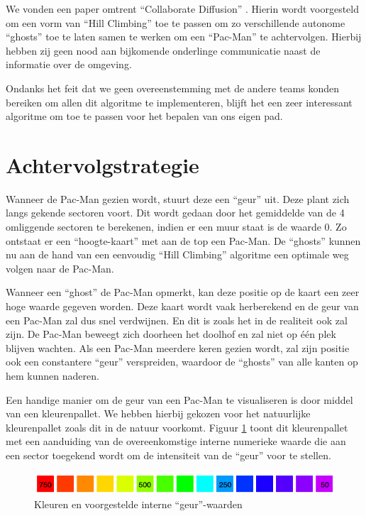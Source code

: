 \documentclass[12pt,a4paper]{report}
\begin{document}
We vonden een paper omtrent ``Collaborate Diffusion'' \cite{Repenning06}. Hierin wordt voorgesteld om een vorm van ``Hill Climbing'' toe te passen om zo verschillende autonome ``ghosts'' toe te laten samen te werken om een ``Pac-Man'' te achtervolgen. Hierbij hebben zij geen nood aan bijkomende onderlinge communicatie naast de informatie over de omgeving.

Ondanks het feit dat we geen overeenstemming met de andere teams konden bereiken om allen dit algoritme te implementeren, blijft het een zeer interessant algoritme om toe te passen voor het bepalen van ons eigen pad.

\section{Achtervolgstrategie}

Wanneer de Pac-Man gezien wordt, stuurt deze een ``geur'' uit. Deze plant zich langs gekende sectoren voort. Dit wordt gedaan door het gemiddelde van de 4 omliggende sectoren te berekenen, indien er een muur staat is de waarde 0. Zo ontstaat er een ``hoogte-kaart'' met aan de top een Pac-Man. De ``ghosts'' kunnen nu aan de hand van een eenvoudig ``Hill Climbing'' algoritme een optimale weg volgen naar de Pac-Man.

Wanneer een ``ghost'' de Pac-Man opmerkt, kan deze positie op de kaart een zeer hoge waarde gegeven worden. Deze kaart wordt vaak herberekend en de geur van een Pac-Man zal dus snel verdwijnen. En dit is zoals het in de realiteit ook zal zijn. De Pac-Man beweegt zich doorheen het doolhof en zal niet op \'e\'en plek blijven wachten. Als een Pac-Man meerdere keren gezien wordt, zal zijn positie ook een constantere ``geur'' verspreiden, waardoor de ``ghosts'' van alle kanten op hem kunnen naderen. 

Een handige manier om de geur van een Pac-Man te visualiseren is door middel van een kleurenpallet. We hebben hierbij gekozen voor het natuurlijke kleurenpallet zoals dit in de natuur voorkomt. Figuur \ref{fig:colormap} toont dit kleurenpallet met een aanduiding van de overeenkomstige interne numerieke waarde die aan een sector toegekend wordt om de intensiteit van de ``geur'' voor te stellen.

\begin{figure}[htbp]
  \centering
  \includegraphics[width=150mm]{resources/colormap.png}
  \caption{Kleuren en voorgestelde interne ``geur''-waarden}
  \label{fig:colormap}
\end{figure}
\end{document}
